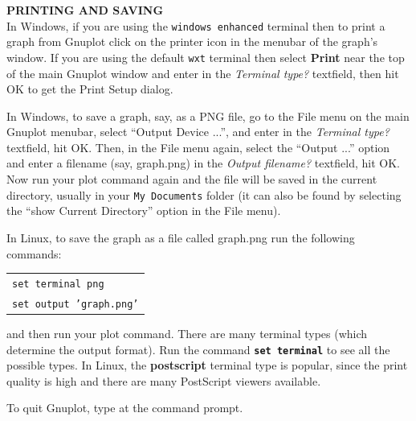 \begin{figure}[H]
 \begin{center}
  
 \end{center}
\end{figure}\vspace{-4mm}
\lineacross
\vspace{3mm}

\par\noindent\textbf{\textsf{PRINTING AND SAVING}}\vspace{2mm}\\
In Windows, if you are using the \texttt{windows enhanced} terminal then to print a graph from
Gnuplot click on the printer icon in the menubar of the graph's window. If you are using the
default \texttt{wxt} terminal then select \textbf{Print} near the top of the main Gnuplot window
and enter  in the \emph{Terminal type?} textfield, then hit OK to get the Print Setup
dialog.

In Windows, to save a graph, say, as a PNG file, go to the File menu on the main Gnuplot menubar,
select ``Output Device ...'', and enter  in the \emph{Terminal type?} textfield, hit OK. Then, in the
File menu again, select the ``Output ...'' option and enter a filename (say, graph.png) in the \emph{Output
filename?} textfield, hit OK. Now run your plot command again and the file will be saved in the
current directory, usually in your \texttt{My Documents} folder (it can also be found by
selecting the ``show Current Directory'' option in the File menu).\\

\par\noindent In Linux, to save the graph as a file called graph.png run the following
commands:\vspace{2mm}

\begin{tabular}{l @{}}
\texttt{set terminal png}\\
\texttt{set output 'graph.png'}
\end{tabular}\vspace{2mm}

\par\noindent and then run your plot command. There are many terminal types (which determine the output format). Run
the command \textbf{\texttt{set terminal}} to see all the possible types. In Linux, the \textbf{postscript} terminal type is
popular, since the print quality is high and there are many PostScript viewers available.
\vspace{2mm}

\par\noindent To quit Gnuplot, type \textbf{} at the \textbf{} command prompt.
